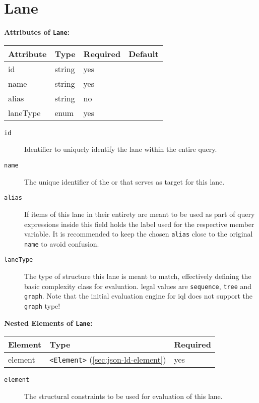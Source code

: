 \documentclass[11pt,a4paper]{report}
\newcommand{\iqlType}[1]{\texttt{\iqlns#1}}
\newcommand{\iqlBaseType}[1]{\texttt{\textless#1\textgreater}}
\newenvironment{attributes}[1]{
	\noindent\textbf{Attributes of #1:}\newline\medskip
	\begin{tabular}{|p{0.3\textwidth}|p{0.20\textwidth}|p{0.20\textwidth}|p{0.17\textwidth}|}
		\hline
		\textbf{Attribute} & \textbf{Type} & \textbf{Required} & \textbf{Default} \\ 
		\hline
		\hline
	}{
	\end{tabular}
}
\newcommand{\attribute}[4]{
	#1 & #2 & #3 & #4 \\
	\hline
}
\newenvironment{elements}[1]{
	\noindent\textbf{Nested Elements of #1:}\newline\medskip
	\begin{tabular}{|p{0.3\textwidth}|p{0.42\textwidth}|p{0.17\textwidth}|}
		\hline
		\textbf{Element} & \textbf{Type} & \textbf{Required} \\ 
		\hline
		\hline
	}{
	\end{tabular}
}
\newcommand{\element}[3]{
	#1 & #2 & #3 \\
	\hline
}
\begin{document}
\section{Lane}
\label{sec:json-ld-lane}
\begin{attributes}{\iqlType{Lane}}
	\attribute{id}{string}{yes}{}
	\attribute{name}{string}{yes}{}
	\attribute{alias}{string}{no}{}
	\attribute{laneType}{enum}{yes}{}
\end{attributes}
\begin{description}
	\item[\iqlType{id}] Identifier to uniquely identify the lane within the entire query.
	\item[\iqlType{name}] The unique identifier of the  or  that serves as target for this lane.
	\item[\iqlType{alias}] If items of this lane in their entirety are meant to be used as part of query expressions inside this field holds the label used for the respective member variable. It is recommended to keep the chosen \texttt{alias} close to the original \texttt{name} to avoid confusion.
	\item[\iqlType{laneType}] The type of structure this lane is meant to match, effectively defining the basic complexity class for evaluation. legal values are \texttt{sequence}, \texttt{tree} and \texttt{graph}. Note that the initial evaluation engine for \ac{iql} does not support the \texttt{graph} type! %
\end{description}
\begin{elements}{\iqlType{Lane}}
	\element{element}{\iqlBaseType{Element} (\ref{sec:json-ld-element})}{yes}
\end{elements}
\begin{description}
	\item[\iqlType{element}] The structural constraints to be used for evaluation of this lane.
\end{description}
\end{document}
